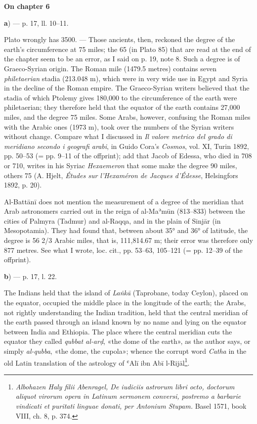 \documentclass[11pt]{article}
\newcommand{\Pg}[1]{\marginpar{\footnotesize\color{gray}#1}}
\newcommand{\UnitHead}[2]{\par\setcounter{footnoteT}{0}\needspace{8\baselineskip}\bigskip\pdfbookmark[1]{#1}{unit-#2}\hypertarget{EN-#2}{}%
 {\large\bfseries\interlinepenalty=10000 #1\par}\nobreak\medskip}
\begin{document}
\UnitHead{On chapter 6}{A06}
\par\begin{center}\textbf{a}) — p. 17, ll. 10–11.\end{center}
\par \Pg{I 165}Plato wrongly has 3500. — Those ancients, then, reckoned the degree of the earth's circumference at 75 miles; the 65 (in Plato 85) that are read at the end of the chapter seem to be an error, as I said on p. 19, note 8. Such a degree is of Graeco-Syrian origin. The Roman mile (1479.5 metres) contains seven \emph{philetaerian} stadia (213.048 m), which were in very wide use in Egypt and Syria in the decline of the Roman empire. The Graeco-Syrian writers believed that the stadia of which Ptolemy gives 180,000 to the circumference of the earth were philetaerian; they therefore held that the equator of the earth contains 27,000 miles, and the degree 75 miles. Some Arabs, however, confusing the Roman miles with the Arabic ones (1973 m), took over the numbers of the Syrian writers without change. Compare what I discussed in \emph{Il valore metrico del grado di meridiano secondo i geografi arabi}, in Guido Cora's \emph{Cosmos}, vol. XI, Turin 1892, pp. 50–53 (= pp. 9–11 of the offprint); add that Jacob of Edessa, who died in 708 or 710, writes in his Syriac \emph{Hexaemeron} that some make the degree 90 miles, others 75 (A. Hjelt, \emph{Études sur l’Hexaméron de Jacques d’Édesse}, Helsingfors 1892, p. 20).\par
\par Al-Battānī does not mention the measurement of a degree of the meridian that Arab astronomers carried out in the reign of al-Maʾmūn (813–833) between the cities of Palmyra (Tadmur) and al-Raqqa, and in the plain of Sinjār (in Mesopotamia). They had found that, between about 35° and 36° of latitude, the degree is 56 2/3 Arabic miles, that is, 111,814.67 m; their error was therefore only 877 metres. See what I wrote, loc. cit., pp. 53–63, 105–121 (= pp. 12–39 of the offprint).\par
\par\begin{center}\textbf{b}) — p. 17, l. 22.\end{center}
\par The Indians held that the island of \emph{Laṅkā} (Taprobane, today Ceylon), placed on the equator, occupied the middle place in the longitude of the earth; the Arabs, not rightly understanding the Indian tradition, held that the central meridian of the earth passed through an island known by no name and lying on the equator between India and Ethiopia. The place where the central meridian cuts the equator they called \emph{qubbat al-arḍ}, «the dome of the earth», as the author says, or simply \emph{al-qubba}, «the dome, the cupola»; whence the corrupt word \emph{Catha} in the old Latin translation of the astrology of ʿAlī ibn Abī l-Rijāl\footnote{\emph{Albohazen Haly filii Abenragel, De iudiciis astrorum libri octo, doctorum aliquot virorum opera in Latinum sermonem conversi, postremo a barbarie vindicati et puritati linguae donati, per Antonium Stupam.} Basel 1571, book VIII, ch. 8, p. 374.}.\par
\end{document}
